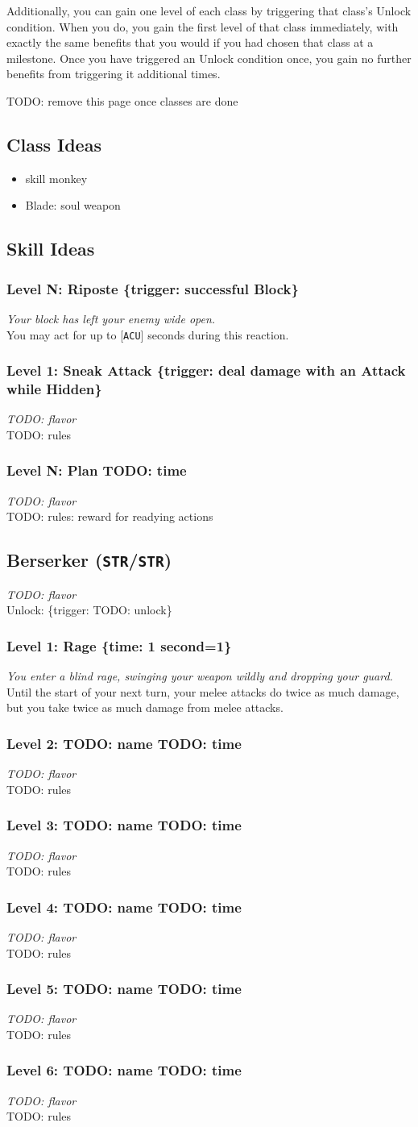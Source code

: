 \documentclass[12pt]{article}
\newcommand{\STR}{\texttt{STR}}
\newcommand{\ACU}{\texttt{ACU}}
\newcommand{\TIME}[1]{\{time: #1 second\if1=#1{}\else{s}\fi\}}
\newcommand{\TRIG}[1]{\{trigger: #1\}}
\newcommand{\Class}[4]{\pagebreak\subsection{#1 (#2)}\label{#1}\textit{#3}\\[1mm]Unlock: \TRIG{#4}}
\newcommand{\Skill}[5]{\subsubsection{Level #1: #2 #3}\textit{#4}\\[1mm]#5}
\begin{document}
Additionally, you can gain one level of each class by triggering that class's Unlock condition. When you do, you gain the first level of that class immediately, with exactly the same benefits that you would if you had chosen that class at a milestone. Once you have triggered an Unlock condition once, you gain no further benefits from triggering it additional times.

\pagebreak
TODO: remove this page once classes are done

\subsection{Class Ideas}
\begin{itemize}
\item skill monkey
\item Blade: soul weapon
\end{itemize}

\subsection{Skill Ideas}

\Skill{N}{Riposte}{\TRIG{successful Block}}
{Your block has left your enemy wide open.}
{You may act for up to [\ACU] seconds during this reaction.}

\Skill{1}{Sneak Attack}{\TRIG{deal damage with an Attack while Hidden}}
{TODO: flavor}
{TODO: rules}

\Skill{N}{Plan}{TODO: time}
{TODO: flavor}
{TODO: rules: reward for readying actions}

%

\Class{Berserker}{\STR/\STR}
{TODO: flavor}
{TODO: unlock}

\Skill{1}{Rage}{\TIME{1}}
{You enter a blind rage, swinging your weapon wildly and dropping your guard.}
{Until the start of your next turn, your melee attacks do twice as much damage, but you take twice as much damage from melee attacks.}

\Skill{2}{TODO: name}{TODO: time}
{TODO: flavor}
{TODO: rules}

\Skill{3}{TODO: name}{TODO: time}
{TODO: flavor}
{TODO: rules}

\Skill{4}{TODO: name}{TODO: time}
{TODO: flavor}
{TODO: rules}

\Skill{5}{TODO: name}{TODO: time}
{TODO: flavor}
{TODO: rules}

\Skill{6}{TODO: name}{TODO: time}
{TODO: flavor}
{TODO: rules}

%
\end{document}
